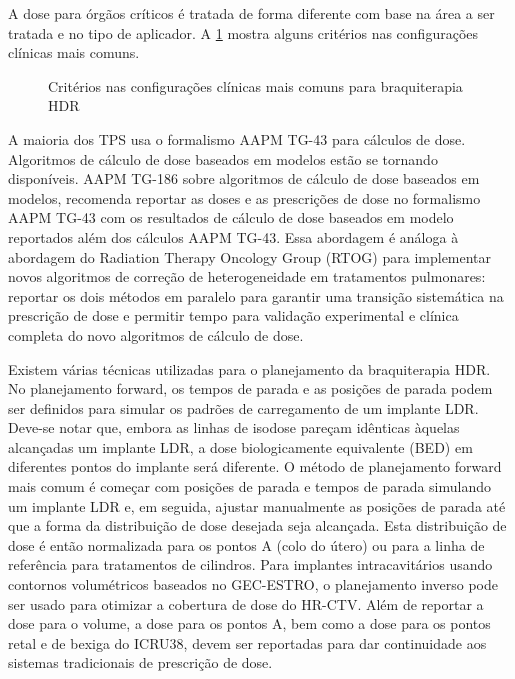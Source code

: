 \documentclass[11pt,a4paper]{article}
\begin{document}
	A dose para órgãos críticos é tratada de forma diferente com base na área a ser tratada e no tipo de aplicador. A \ref{fig:criteriosBraqui} mostra alguns critérios nas configurações clínicas mais comuns.

	\begin{figure}[h]
		\centering
		\caption{Critérios nas configurações clínicas mais comuns para braquiterapia HDR}
		\label{fig:criteriosBraqui}
	\end{figure}

	A maioria dos TPS usa o formalismo AAPM TG-43 para cálculos de dose. Algoritmos de cálculo de dose baseados em modelos estão se tornando disponíveis. AAPM TG-186 sobre algoritmos de cálculo de dose baseados em modelos, recomenda reportar as doses e as prescrições de dose no formalismo AAPM TG-43 com os resultados de cálculo de dose baseados em modelo reportados além dos cálculos AAPM TG-43. Essa abordagem é análoga à abordagem do Radiation Therapy Oncology Group (RTOG) para implementar novos algoritmos de correção de heterogeneidade em tratamentos pulmonares: reportar os dois métodos em paralelo para garantir uma transição sistemática na prescrição de dose e permitir tempo para validação experimental e clínica completa do novo algoritmos de cálculo de dose.

	Existem várias técnicas utilizadas para o planejamento da braquiterapia HDR. No planejamento forward, os tempos de parada e as posições de parada podem ser definidos para simular os padrões de carregamento de um implante LDR. Deve-se notar que, embora as linhas de isodose pareçam idênticas àquelas alcançadas um implante LDR, a dose biologicamente equivalente (BED) em diferentes pontos do implante será diferente. O método de planejamento forward mais comum é começar com posições de parada e tempos de parada simulando um implante LDR e, em seguida, ajustar manualmente as posições de parada até que a forma da distribuição de dose desejada seja alcançada. Esta distribuição de dose é então normalizada para os pontos A (colo do útero) ou para a linha de referência para tratamentos de cilindros. Para implantes intracavitários usando contornos volumétricos baseados no GEC-ESTRO, o planejamento inverso pode ser usado para otimizar a cobertura de dose do HR-CTV. Além de reportar a dose para o volume, a dose para os pontos A, bem como a dose para os pontos retal e de bexiga do ICRU38, devem ser reportadas para dar continuidade aos sistemas tradicionais de prescrição de dose.
\end{document}
